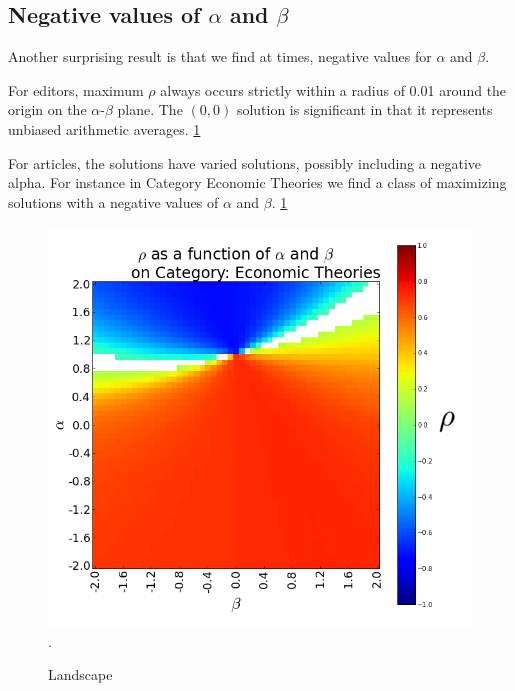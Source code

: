 \documentclass{acm_proc_article-sp}
\begin{document}
\subsection{Negative values of $\alpha$ and $\beta$}
Another surprising result is that we find at times, negative values for $\alpha$ and $\beta$.


For editors, maximum $\rho$ always occurs strictly within a radius of 0.01 around the origin on the  $\alpha$-$\beta$ plane. The $(0,0)$ solution is significant in that it represents unbiased arithmetic averages.
\ref{fig:landscape}

For articles, the solutions have varied solutions, possibly including a negative alpha. For instance in Category Economic Theories we find a class of maximizing solutions with a negative values of $\alpha$ and $\beta$. \ref{fig:landscape} 

\begin{figure}[!t]
\centering
\includegraphics[width=0.9\columnwidth]{landscape.png}.
\caption{Landscape}
\label{fig:landscape}
\end{figure}
\end{document}
